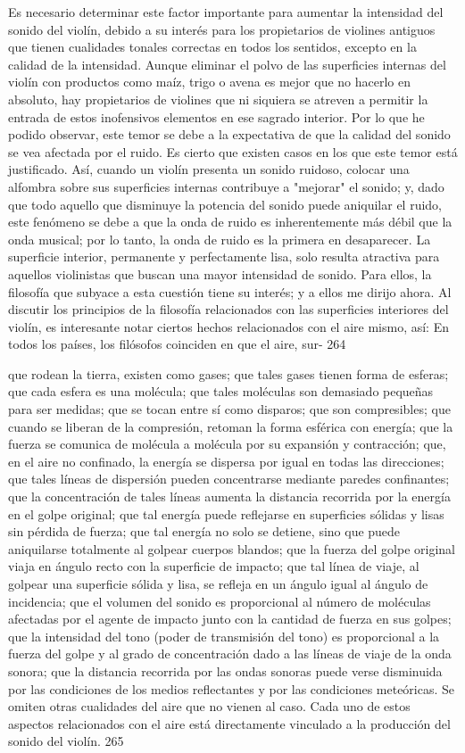 Es necesario determinar este factor importante para aumentar la intensidad del sonido del violín, debido a su interés para los propietarios de violines antiguos que tienen cualidades tonales correctas en todos los sentidos, excepto en la calidad de la intensidad.
Aunque eliminar el polvo de las superficies internas del violín con productos como maíz, trigo o avena es mejor que no hacerlo en absoluto, hay propietarios de violines que ni siquiera se atreven a permitir la entrada de estos inofensivos elementos en ese sagrado interior. Por lo que he podido observar, este temor se debe a la expectativa de que la calidad del sonido se vea afectada por el ruido. Es cierto que existen casos en los que este temor está justificado. Así, cuando un violín presenta un sonido ruidoso, colocar una alfombra sobre sus superficies internas contribuye a "mejorar" el sonido; y, dado que todo aquello que disminuye la potencia del sonido puede aniquilar el ruido, este fenómeno se debe a que la onda de ruido es inherentemente más débil que la onda musical; por lo tanto, la onda de ruido es la primera en desaparecer.
La superficie interior, permanente y perfectamente lisa, solo resulta atractiva para aquellos violinistas que buscan una mayor intensidad de sonido. Para ellos, la filosofía que subyace a esta cuestión tiene su interés; y a ellos me dirijo ahora.
Al discutir los principios de la filosofía relacionados con las superficies interiores del violín, es interesante notar ciertos hechos relacionados con el aire mismo, así: En todos los países, los filósofos coinciden en que el aire, sur-
264

que rodean la tierra, existen como gases; que tales gases tienen forma de esferas; que cada esfera es una molécula; que tales moléculas son demasiado pequeñas para ser medidas; que se tocan entre sí como disparos;
que son compresibles; que cuando se liberan de la compresión, retoman la forma esférica con energía; que la fuerza se comunica de molécula a molécula por su expansión y contracción; que, en el aire no confinado, la energía se dispersa por igual en todas las direcciones; que tales líneas de dispersión pueden concentrarse mediante paredes confinantes; que la concentración de tales líneas aumenta la distancia recorrida por la energía en el golpe original; que tal energía puede reflejarse en superficies sólidas y lisas sin pérdida de fuerza; que tal energía no solo se detiene, sino que puede aniquilarse totalmente al golpear cuerpos blandos; que la fuerza del golpe original viaja en ángulo recto con la superficie de impacto; que tal línea de viaje, al golpear una superficie sólida y lisa, se refleja en un ángulo igual al ángulo de incidencia; que el volumen del sonido es proporcional al número de moléculas afectadas por el agente de impacto junto con la cantidad de fuerza en sus golpes; que la intensidad del tono (poder de transmisión del tono) es proporcional a la fuerza del golpe y al grado de concentración dado a las líneas de viaje de la onda sonora; que la distancia recorrida por las ondas sonoras puede verse disminuida por las condiciones de los medios reflectantes y por las condiciones meteóricas.
Se omiten otras cualidades del aire que no vienen al caso. Cada uno de estos aspectos relacionados con el aire está directamente vinculado a la producción del sonido del violín.
265

